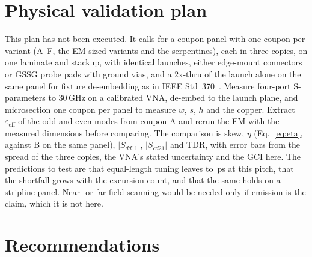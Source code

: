 \documentclass[10pt,twocolumn]{article}
\newcommand{\Sdd}[1]{S_{dd#1}}
\newcommand{\Scd}[1]{S_{cd#1}}
\newcommand{\eeff}{\varepsilon_{\mathrm{eff}}}
\begin{document}
\section{Physical validation plan}
\label{sec:validation}

This plan has not been executed. It calls for a coupon panel with one coupon per variant (A--F, the EM-sized
variants and the serpentines), each in three copies, on one laminate and stackup, with identical launches, either
edge-mount connectors or GSSG probe pads with ground vias, and a 2x-thru of the launch alone on the same panel for fixture de-embedding as in IEEE
Std~370~\cite{ieee370}. Measure four-port S-parameters to 30\,GHz on a calibrated VNA, de-embed to the launch
plane, and microsection one coupon per panel to measure $w$, $s$, $h$ and the copper. Extract $\eeff$ of the odd
and even modes from coupon A and rerun the EM with the measured dimensions before comparing. The comparison is
skew, $\eta$ (Eq.~\ref{eq:eta}, against B on the same panel), $|\Sdd{11}|$, $|\Scd{21}|$ and TDR, with error bars
from the spread of the three copies, the VNA's stated uncertainty and the GCI here. The predictions to test are
that equal-length tuning leaves \SkewF{} to \SkewD\,ps at this pitch, that the shortfall grows with the excursion
count, and that the same holds on a stripline panel.
Near- or far-field scanning would be needed only if emission is the claim, which it is not here.

\section{Recommendations}
\label{sec:recommendations}
\end{document}
